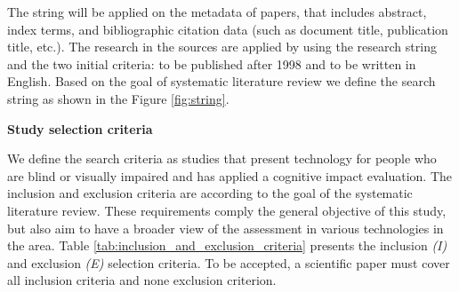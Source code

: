 The string will be applied on the metadata of papers, that includes abstract, index terms, and bibliographic citation data (such as document title, publication title, etc.). The research in the sources are applied by using the research string and the two initial criteria: to be published after 1998 and to be written in English. Based on the goal of systematic literature review we define the search string as shown in the Figure \ref{fig:string}.

 	\begin{figure}[h] 
   	    \captionsetup{width=14cm}%
	\end{figure}


\textbf{Study selection criteria}

We define the search criteria as studies that present technology for people who are blind or visually impaired and has applied a cognitive impact evaluation. The inclusion and exclusion criteria are according to the goal of the systematic literature review. These requirements comply the general objective of this study, but also aim to have a broader view of the assessment in various technologies in the area. Table \ref{tab:inclusion_and_exclusion_criteria} presents the inclusion \textit{(I)} and exclusion \textit{(E)} selection criteria. To be accepted, a scientific paper must cover all inclusion criteria and none exclusion criterion.

